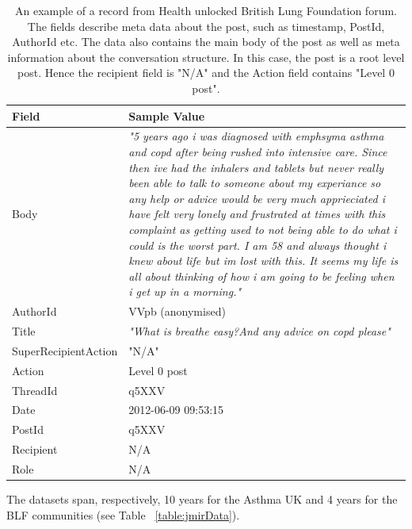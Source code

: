 \begin{table}[htb!]
    \centering
    \begin{tabular}{ |p{5cm}|p{10cm}| }
        \hline
        \textbf{Field} & \textbf{Sample Value}\\
        \hline
        Body   	&  \textit{"5 years ago i was diagnosed with emphsyma asthma and copd after being rushed into intensive care.
        Since then ive had the inhalers and tablets but never really been able to talk to someone about my 
        experiance so any help or advice would be very much apprieciated i have felt very lonely and frustrated 
        at times with this complaint as getting used to not being able to do what i could is the worst part.
        I am 58 and always thought i knew about life but im lost with this.
        It seems my life is all about thinking of how i am going to be feeling when i get up in a morning."}  \\
        \hline
        AuthorId & VVpb (anonymised) \\
        \hline
        Title & \textit{"What is breathe easy?And any advice on copd please"} \\
        \hline
        SuperRecipientAction & "N/A" \\
        \hline
        Action & Level 0 post \\
        \hline
        ThreadId & q5XXV \\
        \hline
        Date & 2012-06-09 09:53:15 \\
        \hline
        PostId & q5XXV \\
        \hline
        Recipient & N/A\\
        \hline
        Role & N/A\\
        \hline
        
    \end{tabular}
\caption{An example of a record from Health unlocked British Lung Foundation forum. The fields describe meta data about the post, such as timestamp, PostId, AuthorId etc. The data also contains the main body of the post as well as meta information about the conversation structure. In this case, the post is a root level post. Hence the recipient field is "N/A" and the Action field contains "Level 0 post".}
\label{table:sample}
\end{table}
        

The datasets span, respectively, 10 years for the Asthma UK and 4 years for the BLF communities (see Table ~\ref{table:jmirData}).

